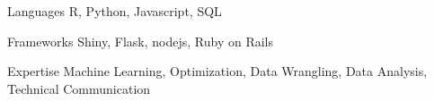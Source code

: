 

\begin{cvskills}

  \cvskill
    {Languages} %
    {R, Python, Javascript, SQL} %

  \cvskill
    {Frameworks} %
    {Shiny, Flask, nodejs, Ruby on Rails} %

  \cvskill
    {Expertise} %
    {Machine Learning, Optimization, Data Wrangling, Data Analysis, Technical Communication} %

\end{cvskills}

